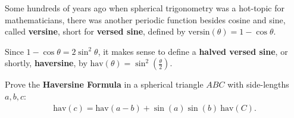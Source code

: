 \begin{tcolorbox}[title={Spherical Law of Haversines}]
    \begin{definition}
        Some hundreds of years ago when spherical trigonometry was a hot-topic for mathematicians, there was another periodic function besides cosine and sine, called \textbf{versine}, short for \textbf{versed sine}, defined by $\text{versin}(\theta)=1-\cos \theta$.
    \end{definition}
    \begin{definition}
        Since $1-\cos\theta=2\sin^2\theta$, it makes sense to define a \textbf{halved versed sine}, or shortly, \textbf{haversine}, by $\text{hav}(\theta)=\sin^2\left(\frac{\theta}{2}\right)$.
    \end{definition}
    \begin{question}\label{q:hav}
        Prove the \textbf{Haversine Formula} in a spherical triangle $ABC$ with side-lengths $a,b,c$:
        \begin{align*}
            \text{hav}(c) = \text{hav}(a-b) +\sin(a) \sin(b) \  \text{hav}(C). 
        \end{align*}
    \end{question}
\end{tcolorbox}

